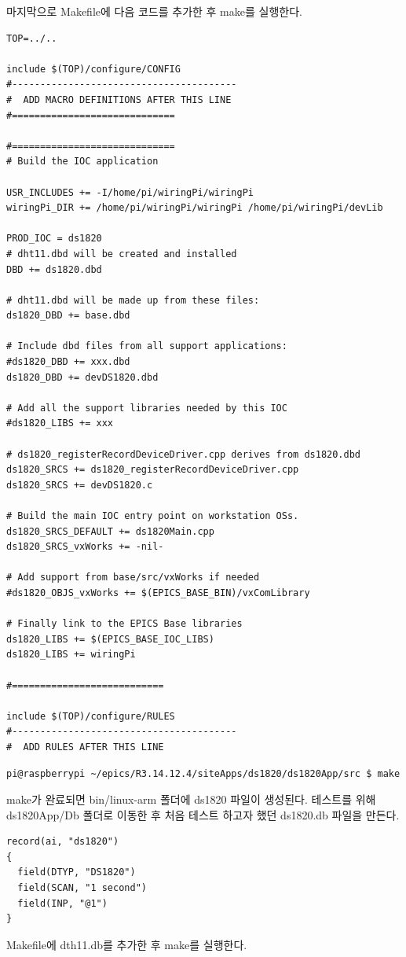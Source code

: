 \documentclass[11pt
  , a4paper
  , article
  , oneside
]{memoir}
\begin{document}
마지막으로 Makefile에 다음 코드를 추가한 후 make를 실행한다.
\begin{lstlisting}[style=termstyle]
TOP=../..

include $(TOP)/configure/CONFIG
#----------------------------------------
#  ADD MACRO DEFINITIONS AFTER THIS LINE
#=============================

#=============================
# Build the IOC application

USR_INCLUDES += -I/home/pi/wiringPi/wiringPi
wiringPi_DIR += /home/pi/wiringPi/wiringPi /home/pi/wiringPi/devLib

PROD_IOC = ds1820
# dht11.dbd will be created and installed
DBD += ds1820.dbd

# dht11.dbd will be made up from these files:
ds1820_DBD += base.dbd

# Include dbd files from all support applications:
#ds1820_DBD += xxx.dbd
ds1820_DBD += devDS1820.dbd

# Add all the support libraries needed by this IOC
#ds1820_LIBS += xxx

# ds1820_registerRecordDeviceDriver.cpp derives from ds1820.dbd
ds1820_SRCS += ds1820_registerRecordDeviceDriver.cpp
ds1820_SRCS += devDS1820.c

# Build the main IOC entry point on workstation OSs.
ds1820_SRCS_DEFAULT += ds1820Main.cpp
ds1820_SRCS_vxWorks += -nil-

# Add support from base/src/vxWorks if needed
#ds1820_OBJS_vxWorks += $(EPICS_BASE_BIN)/vxComLibrary

# Finally link to the EPICS Base libraries
ds1820_LIBS += $(EPICS_BASE_IOC_LIBS)
ds1820_LIBS += wiringPi

#===========================

include $(TOP)/configure/RULES
#----------------------------------------
#  ADD RULES AFTER THIS LINE
\end{lstlisting}
\begin{lstlisting}[style=termstyle]
pi@raspberrypi ~/epics/R3.14.12.4/siteApps/ds1820/ds1820App/src $ make
\end{lstlisting}
make가 완료되면 bin/linux-arm 폴더에 ds1820 파일이 생성된다.
테스트를 위해 ds1820App/Db 폴더로 이동한 후 처음 테스트 하고자 했던 ds1820.db 파일을 만든다.
\begin{lstlisting}[style=termstyle]
record(ai, "ds1820")
{
  field(DTYP, "DS1820")
  field(SCAN, "1 second")
  field(INP, "@1")
}
\end{lstlisting}
Makefile에 dth11.db를 추가한 후 make를 실행한다.
\end{document}
